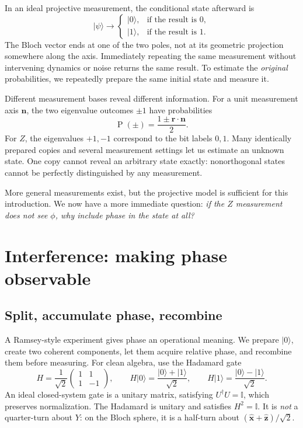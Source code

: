 \documentclass[11pt,a4paper]{article}
\newcommand{\ket}[1]{\lvert #1\rangle}
\newcommand{\Prob}{\mathop{\mathrm{P}}}
\newcommand{\id}{\mathbb I}
\begin{document}
In an ideal projective measurement, the conditional state afterward is
\[
\ket{\psi}\longrightarrow
\begin{cases}
\ket{0},&\text{if the result is }0,\\
\ket{1},&\text{if the result is }1.
\end{cases}
\]
The Bloch vector ends at one of the two poles, not at its geometric projection somewhere along the axis. Immediately repeating the same measurement without intervening dynamics or noise returns the same result. To estimate the \emph{original} probabilities, we repeatedly prepare the same initial state and measure it.

Different measurement bases reveal different information. For a unit measurement axis $\mathbf n$, the two eigenvalue outcomes $\pm1$ have probabilities
\[
\Prob(\pm)=\frac{1\pm\mathbf r\cdot\mathbf n}{2}.
\]
For $Z$, the eigenvalues $+1,-1$ correspond to the bit labels $0,1$. Many identically prepared copies and several measurement settings let us estimate an unknown state. One copy cannot reveal an arbitrary state exactly: nonorthogonal states cannot be perfectly distinguished by any measurement.

More general measurements exist, but the projective model is sufficient for this introduction. We now have a more immediate question: \emph{if the $Z$ measurement does not see $\phi$, why include phase in the state at all?}

\section{Interference: making phase observable}\label{sec: interference}
\subsection{Split, accumulate phase, recombine}
A Ramsey-style experiment gives phase an operational meaning. We prepare $\ket{0}$, create two coherent components, let them acquire relative phase, and recombine them before measuring. For clean algebra, use the Hadamard gate
\begin{equation}
H=\frac1{\sqrt2}\begin{pmatrix}1&1\\1&-1\end{pmatrix},\qquad
H\ket{0}=\frac{\ket{0}+\ket{1}}{\sqrt2},\qquad
H\ket{1}=\frac{\ket{0}-\ket{1}}{\sqrt2}.
\end{equation}
An ideal closed-system gate is a unitary matrix, satisfying $U^\dagger U=\id$, which preserves normalization. The Hadamard is unitary and satisfies $H^2=\id$. It is \emph{not} a quarter-turn about $Y$: on the Bloch sphere, it is a half-turn about $(\hat{\mathbf x}+\hat{\mathbf z})/\sqrt2$.
\end{document}
